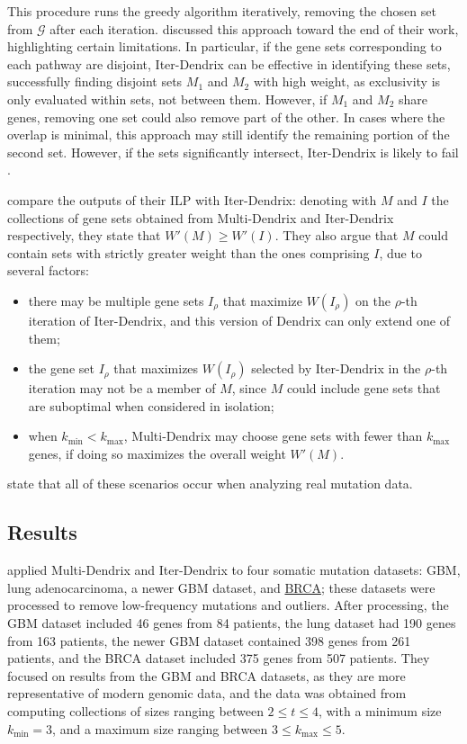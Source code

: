 This procedure runs the greedy algorithm iteratively, removing the chosen set from $\mathcal{G}$ after each iteration. \textcite{dendrix} discussed this approach toward the end of their work, highlighting certain limitations. In particular, if the gene sets corresponding to each pathway are disjoint, Iter-Dendrix can be effective in identifying these sets, successfully finding disjoint sets $M_1$ and $M_2$ with high weight, as exclusivity is only evaluated within sets, not between them. However, if $M_1$ and $M_2$ share genes, removing one set could also remove part of the other. In cases where the overlap is minimal, this approach may still identify the remaining portion of the second set. However, if the sets significantly intersect, Iter-Dendrix is likely to fail \cite{dendrix}.

\textcite{multi-dendrix} compare the outputs of their ILP with Iter-Dendrix: denoting with $M$ and $I$ the collections of gene sets obtained from Multi-Dendrix and Iter-Dendrix respectively, they state that $W'(M) \ge W'(I)$. They also argue that $M$ could contain sets with strictly greater weight than the ones comprising $I$, due to several factors:

\begin{itemize}
    \item there may be multiple gene sets $I_\rho$ that maximize $W(I_\rho)$ on the $\rho$-th iteration of Iter-Dendrix, and this version of Dendrix can only extend one of them;
    \item the gene set $I_\rho$ that maximizes $W(I_\rho)$ selected by Iter-Dendrix in the $\rho$-th iteration may not be a member of $M$, since $M$ could include gene sets that are suboptimal when considered in isolation;
    \item when $k_\mathrm{min} < k_\mathrm{max}$, Multi-Dendrix may choose gene sets with fewer than $k_\mathrm{max}$ genes, if doing so maximizes the overall weight $W'(M)$.
\end{itemize}

\textcite{multi-dendrix} state that all of these scenarios occur when analyzing real mutation data.

\subsection{Results} \label{results_multi-dendrix}

\textcite{multi-dendrix} applied Multi-Dendrix and Iter-Dendrix to four somatic mutation datasets: GBM, lung adenocarcinoma, a newer GBM dataset, and \href{https://en.wikipedia.org/wiki/Breast_cancer}{BRCA}; these datasets were processed to remove low-frequency mutations and outliers. After processing, the GBM dataset included 46 genes from 84 patients, the lung dataset had 190 genes from 163 patients, the newer GBM dataset contained 398 genes from 261 patients, and the BRCA dataset included 375 genes from 507 patients. They focused on results from the GBM and BRCA datasets, as they are more representative of modern genomic data, and the data was obtained from computing collections of sizes ranging between $2 \le t \le 4$, with a minimum size $k_\mathrm {min} = 3$, and a maximum size ranging between $3 \le k_\mathrm{max} \le 5$.

